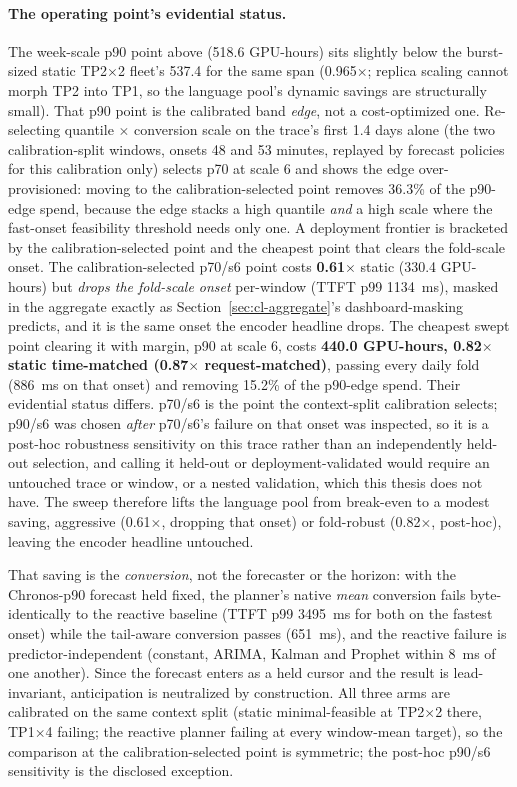 \paragraph{The operating point's evidential status.} The week-scale p90
point above (518.6 GPU-hours) sits slightly below the burst-sized static
TP2$\times$2 fleet's 537.4 for the same span (0.965$\times$; replica
scaling cannot morph TP2 into TP1, so the language pool's dynamic savings
are structurally small).
That p90 point is the calibrated band \emph{edge}, not a cost-optimized one.
Re-selecting quantile $\times$ conversion scale on the trace's first 1.4 days
alone (the two calibration-split windows, onsets 48 and 53
minutes, replayed by forecast policies for this calibration only) selects p70
at scale 6 and shows the edge over-provisioned: moving to the
calibration-selected point removes 36.3\% of the p90-edge spend,
because the edge stacks a high quantile \emph{and} a high scale
where the fast-onset feasibility threshold needs only one. A deployment
frontier is bracketed by the calibration-selected point and the cheapest
point that clears the fold-scale onset. The calibration-selected p70/s6 point costs
\textbf{0.61$\times$} static (330.4 GPU-hours) but \emph{drops the fold-scale
onset} per-window (TTFT p99 \SI{1134}{\milli\second}), masked in the
aggregate exactly as Section~\ref{sec:cl-aggregate}'s dashboard-masking
predicts, and it is the same onset the encoder headline drops. The cheapest
swept point clearing it with margin, p90 at scale 6, costs \textbf{440.0
GPU-hours, 0.82$\times$ static time-matched (0.87$\times$ request-matched)},
passing every daily fold (\SI{886}{\milli\second} on that onset) and removing
15.2\% of the p90-edge spend. Their evidential status differs.
p70/s6 is the point the context-split calibration selects; p90/s6 was chosen
\emph{after} p70/s6's failure on that onset was inspected, so it is a post-hoc
robustness sensitivity on this trace rather than an independently held-out
selection, and calling
it held-out or deployment-validated would require an untouched trace or window,
or a nested validation, which this thesis does not have. The sweep therefore
lifts the language pool from break-even to a modest saving, aggressive
(0.61$\times$, dropping that onset) or fold-robust (0.82$\times$, post-hoc),
leaving the encoder headline untouched.

That saving is the \emph{conversion}, not the forecaster or the horizon: with
the Chronos-p90 forecast held fixed, the planner's native \emph{mean}
conversion fails byte-identically to the reactive baseline (TTFT p99
\SI{3495}{\milli\second} for both on the fastest onset) while the tail-aware conversion passes
(\SI{651}{\milli\second}), and the reactive failure is predictor-independent
(constant, ARIMA, Kalman and Prophet within \SI{8}{\milli\second} of one
another). Since the forecast enters as a held cursor and the result is
lead-invariant, anticipation is neutralized by construction. All three arms are
calibrated on the same context split (static minimal-feasible at TP2$\times$2
there, TP1$\times$4 failing; the reactive planner failing at every window-mean
target), so the comparison at the calibration-selected point is symmetric; the
post-hoc p90/s6 sensitivity is the disclosed exception.

